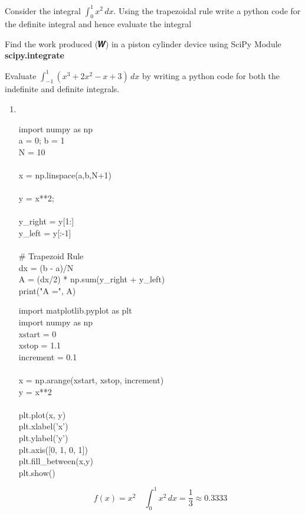 \begin{posttest}[\textcolor{red}{End of Module 9 Quiz}]
\item Consider the integral $\int_0^1x^2\,dx$. Using the trapezoidal rule write a python code for the definite integral and hence evaluate the integral
\item Find the work produced (𝑾) in a piston cylinder device using SciPy Module {\bf scipy.integrate}
\item Evaluate $\int_{-1}^1(𝑥^3 +2𝑥^2-𝑥+3)\,dx$ by writing a python code for both the indefinite and definite integrals.
\begin{mysolution}
\begin{enumerate}[label=\arabic*.]
\item ~\\
\begin{boxB}
import numpy as np\\
 a = 0; b = 1\\
 N = 10\\
\\
 x = np.linspace(a,b,N+1)\\
\\
 y = x**2;\\
\\
 y\_right = y[1:]\\
 y\_left = y[:-1]\\
\\
\# Trapezoid Rule\\
 dx = (b - a)/N\\
 A = (dx/2) * np.sum(y\_right + y\_left)\\
 print("A =", A)\\
\end{boxB}


\begin{boxB}
 import matplotlib.pyplot as plt\\
 import numpy as np\\
 xstart = 0\\
 xstop = 1.1\\
 increment = 0.1\\
\\
 x = np.arange(xstart, xstop, increment)\\
 y = x**2\\
\\
 plt.plot(x, y)\\
 plt.xlabel('x')\\
 plt.ylabel('y')\\
 plt.axis([0, 1, 0, 1])\\
 plt.fill\_between(x,y)\\
 plt.show()
\end{boxB}
\[f(x)=x^2\quad \int_0^1x^2\,dx=\frac13\approx0.3333\]



\end{enumerate}
\end{mysolution}
\end{posttest}
